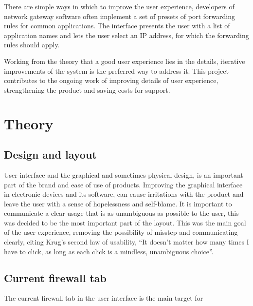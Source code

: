 \documentclass[a4paper,11pt,makeidx]{kth-bcs}
\begin{document}
There are simple ways in which to improve the user experience, developers of network gateway software often implement a set of presets of port forwarding rules for common applications.
The interface presents the user with a list of application names and lets the user select an IP address, for which the forwarding rules should apply.

Working from the theory that a good user experience lies in the details, iterative improvements of the system is the preferred way to address it.
This project contributes to the ongoing work of improving details of user experience, strengthening the product and saving costs for support.

\chapter{Theory}

\section{Design and layout}
User interface and the graphical and sometimes physical design, is an important part of the brand and ease of use of products.
Improving the graphical interface in electronic devices and its software, can cause irritations with the product and leave the user with a sense of hopelessness and self-blame.\cite[p.~34]{norman2002design}
It is important to communicate a clear usage that is as unambiguous as possible to the user, this was decided to be the most important part of the layout.
This was the main goal of the user experience, removing the possibility of misstep and communicating clearly, citing Krug's second law of usability\cite[p.~41]{krug2006don}, ``It doesn’t matter how many times I have to click, as long as each click is a mindless, unambiguous choice''.

\section{Current firewall tab}
The current firewall tab in the user interface is the main target for
\end{document}
